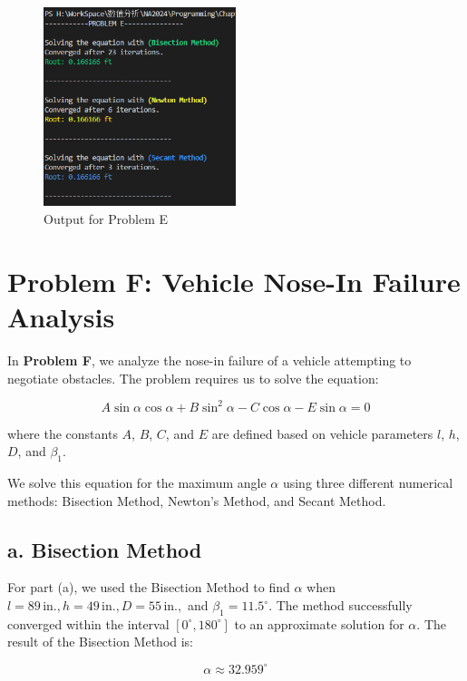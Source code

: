 \documentclass[a4paper]{article}
\begin{document}
\begin{figure}[H]  %
  \centering
  \includegraphics[width=0.5\textwidth]{./picture/ProblemE.png}
  \caption{Output for Problem E}
\end{figure}


\section{Problem F: Vehicle Nose-In Failure Analysis}

In \textbf{Problem F}, we analyze the nose-in failure of a vehicle attempting to negotiate obstacles. The problem requires us to solve the equation:

\[
A \sin \alpha \cos \alpha + B \sin^2 \alpha - C \cos \alpha - E \sin \alpha = 0
\]

where the constants \( A \), \( B \), \( C \), and \( E \) are defined based on vehicle parameters \( l \), \( h \), \( D \), and \( \beta_1 \).

We solve this equation for the maximum angle \( \alpha \) using three different numerical methods: Bisection Method, Newton's Method, and Secant Method.

\subsection* {a. Bisection Method}
For part (a), we used the Bisection Method to find \( \alpha \) when \( l = 89 \, \text{in.}, h = 49 \, \text{in.}, D = 55 \, \text{in.}, \) and \( \beta_1 = 11.5^\circ \). The method successfully converged within the interval \([0^\circ, 180^\circ]\) to an approximate solution for \( \alpha \). The result of the Bisection Method is:

\[
\alpha \approx 32.959^\circ
\]
\end{document}

